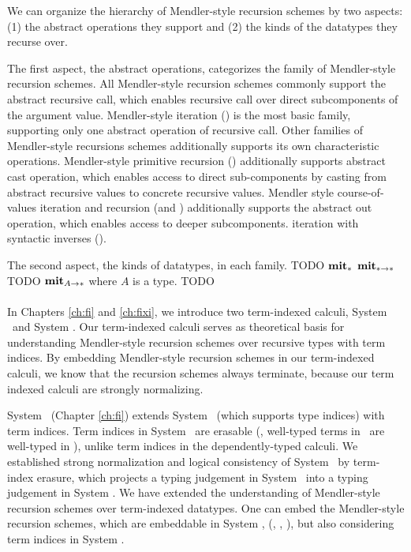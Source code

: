 We can organize the hierarchy of Mendler-style recursion schemes
by two aspects: (1) the abstract operations they support and
(2) the kinds of the datatypes they recurse over.

The first aspect, the abstract operations, categorizes the family
of Mendler-style recursion schemes. All Mendler-style recursion schemes
commonly support the abstract recursive call, which enables recursive
call over direct subcomponents of the argument value.
Mendler-style iteration (\MIt) is the most basic family,
supporting only one abstract operation of recursive call. Other
families of Mendler-style recursions schemes additionally supports
its own characteristic operations. Mendler-style primitive recursion (\MPr)
additionally supports abstract cast operation, which enables access to
direct sub-components by casting from abstract recursive values to
concrete recursive values. Mendler style course-of-values iteration and
recursion (\McvIt and \McvPr) additionally supports the abstract out
operation, which enables access to deeper subcomponents.
iteration with syntactic inverses (\MsfIt).

The second aspect, the kinds of datatypes, 
in each family.
TODO
$\mathbf{mit}_{*}$
$\mathbf{mit}_{* -> *}$
TODO
$\mathbf{mit}_{A -> *}$ where $A$ is a type.
TODO


\paragraph{}
In Chapters \ref{ch:fi} and \ref{ch:fixi}, we introduce
two term-indexed calculi, System \Fi\ and System \Fixi.
Our term-indexed calculi serves as theoretical basis for understanding
Mendler-style recursion schemes over recursive types with term indices.
By embedding Mendler-style recursion schemes in our term-indexed calculi,
we know that the recursion schemes always terminate, because our term
indexed calculi are strongly normalizing.

System \Fi\ (Chapter \ref{ch:fi}) extends System \Fw\ (which supports
type indices) with term indices.  Term indices in System \Fi\ are erasable
(\ie, well-typed terms in \Fi\ are well-typed in \Fw), unlike
term indices in the dependently-typed calculi. We established
strong normalization and logical consistency of System \Fi\ by
term-index erasure, which projects a typing judgement in System \Fi\ into
a typing judgement in System \Fw. We have extended the understanding of
Mendler-style recursion schemes over term-indexed datatypes. One can embed
the Mendler-style recursion schemes, which are embeddable in System \Fw,
(\eg, \MIt, \MsfIt), but also considering term indices in System \Fi.

